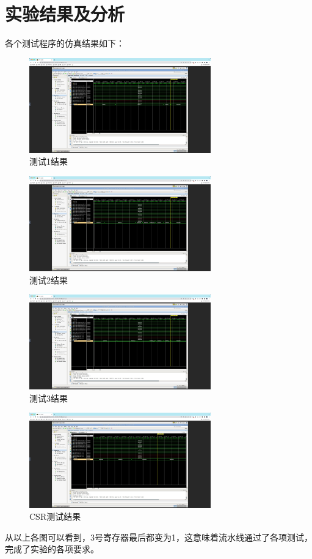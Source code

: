 \documentclass[UTF8]{article}
\begin{document}
    \section{实验结果及分析}
    各个测试程序的仿真结果如下：\\
    \begin{figure}[H]
        \centering
        \includegraphics[width=0.7\textwidth]{./figs/test1_result.jpg}
        \caption{测试1结果}
        \label{test1}
    \end{figure}
    \begin{figure}[H]
        \centering
        \includegraphics[width=0.7\textwidth]{./figs/test2_result.jpg}
        \caption{测试2结果}
        \label{test2}
    \end{figure}
    \begin{figure}[H]
        \centering
        \includegraphics[width=0.7\textwidth]{./figs/test3_result.jpg}
        \caption{测试3结果}
        \label{test3}
    \end{figure}
    \begin{figure}[H]
        \centering
        \includegraphics[width=0.7\textwidth]{./figs/csr_result.jpg}
        \caption{CSR测试结果}
        \label{csr test}
    \end{figure}
    从以上各图可以看到，3号寄存器最后都变为1，这意味着流水线通过了各项测试，完成了实验的各项要求。
\end{document}
